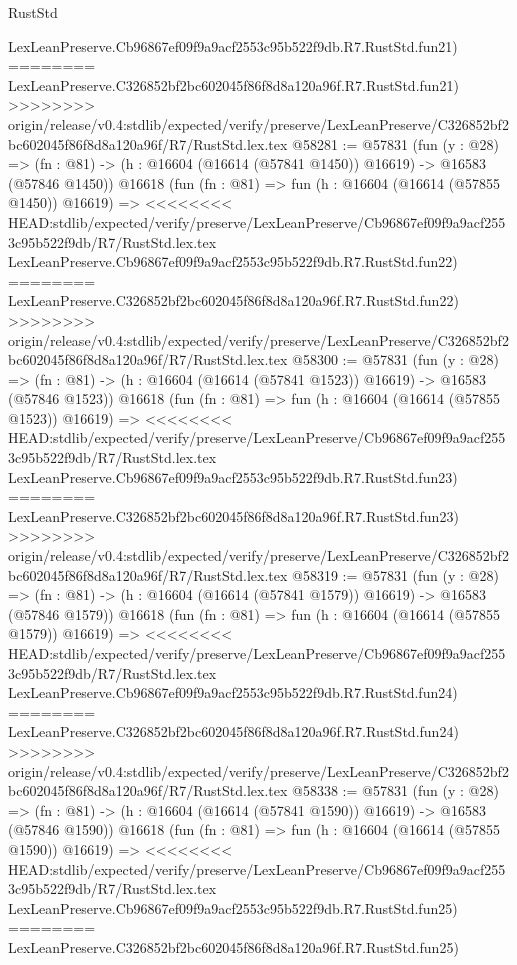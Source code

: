 \begin{lexlean}{RustStd}
\begin{coremodule}
{\begin{coremodule}
{{{{{{{{{{{{{{{{{{{{{{{{{{{{{{{{{{{{{{{{{{{{{{{{{{{{{{{    LexLeanPreserve.Cb96867ef09f9a9acf2553c95b522f9db.R7.RustStd.fun21)
========
    LexLeanPreserve.C326852bf2bc602045f86f8d8a120a96f.R7.RustStd.fun21)
>>>>>>>> origin/release/v0.4:stdlib/expected/verify/preserve/LexLeanPreserve/C326852bf2bc602045f86f8d8a120a96f/R7/RustStd.lex.tex
@58281 := @57831
    (fun (y : @28) =>
    (fn : @81) -> (h : @16604 (@16614 (@57841 @1450)) @16619) -> @16583 (@57846 @1450))
    @16618
    (fun (fn : @81) =>
    fun (h : @16604 (@16614 (@57855 @1450)) @16619) =>
<<<<<<<< HEAD:stdlib/expected/verify/preserve/LexLeanPreserve/Cb96867ef09f9a9acf2553c95b522f9db/R7/RustStd.lex.tex
    LexLeanPreserve.Cb96867ef09f9a9acf2553c95b522f9db.R7.RustStd.fun22)
========
    LexLeanPreserve.C326852bf2bc602045f86f8d8a120a96f.R7.RustStd.fun22)
>>>>>>>> origin/release/v0.4:stdlib/expected/verify/preserve/LexLeanPreserve/C326852bf2bc602045f86f8d8a120a96f/R7/RustStd.lex.tex
@58300 := @57831
    (fun (y : @28) =>
    (fn : @81) -> (h : @16604 (@16614 (@57841 @1523)) @16619) -> @16583 (@57846 @1523))
    @16618
    (fun (fn : @81) =>
    fun (h : @16604 (@16614 (@57855 @1523)) @16619) =>
<<<<<<<< HEAD:stdlib/expected/verify/preserve/LexLeanPreserve/Cb96867ef09f9a9acf2553c95b522f9db/R7/RustStd.lex.tex
    LexLeanPreserve.Cb96867ef09f9a9acf2553c95b522f9db.R7.RustStd.fun23)
========
    LexLeanPreserve.C326852bf2bc602045f86f8d8a120a96f.R7.RustStd.fun23)
>>>>>>>> origin/release/v0.4:stdlib/expected/verify/preserve/LexLeanPreserve/C326852bf2bc602045f86f8d8a120a96f/R7/RustStd.lex.tex
@58319 := @57831
    (fun (y : @28) =>
    (fn : @81) -> (h : @16604 (@16614 (@57841 @1579)) @16619) -> @16583 (@57846 @1579))
    @16618
    (fun (fn : @81) =>
    fun (h : @16604 (@16614 (@57855 @1579)) @16619) =>
<<<<<<<< HEAD:stdlib/expected/verify/preserve/LexLeanPreserve/Cb96867ef09f9a9acf2553c95b522f9db/R7/RustStd.lex.tex
    LexLeanPreserve.Cb96867ef09f9a9acf2553c95b522f9db.R7.RustStd.fun24)
========
    LexLeanPreserve.C326852bf2bc602045f86f8d8a120a96f.R7.RustStd.fun24)
>>>>>>>> origin/release/v0.4:stdlib/expected/verify/preserve/LexLeanPreserve/C326852bf2bc602045f86f8d8a120a96f/R7/RustStd.lex.tex
@58338 := @57831
    (fun (y : @28) =>
    (fn : @81) -> (h : @16604 (@16614 (@57841 @1590)) @16619) -> @16583 (@57846 @1590))
    @16618
    (fun (fn : @81) =>
    fun (h : @16604 (@16614 (@57855 @1590)) @16619) =>
<<<<<<<< HEAD:stdlib/expected/verify/preserve/LexLeanPreserve/Cb96867ef09f9a9acf2553c95b522f9db/R7/RustStd.lex.tex
    LexLeanPreserve.Cb96867ef09f9a9acf2553c95b522f9db.R7.RustStd.fun25)
========
    LexLeanPreserve.C326852bf2bc602045f86f8d8a120a96f.R7.RustStd.fun25)
}}}}}}}}}}}}}}}}}}}}}}}}}}}}}}}}}}}}}}}}}}}}}}}}}}}}}}}
\end{coremodule}}
\end{coremodule}
\end{lexlean}
